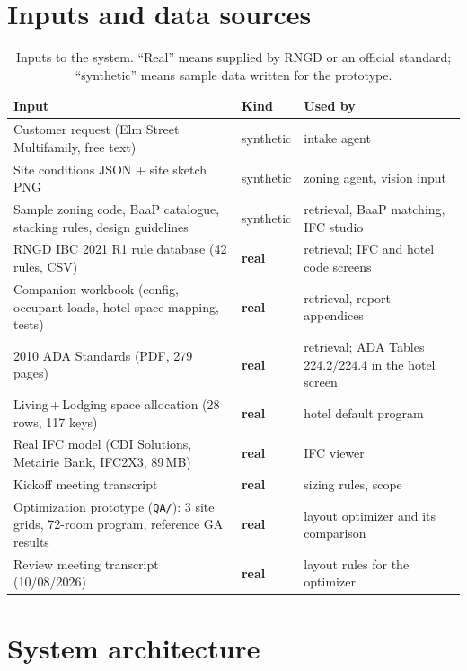 \documentclass[10pt,a4paper]{article}
\newcommand{\code}[1]{\texttt{\small #1}}
\theoremstyle{definition}
\begin{document}
\section{Inputs and data sources}
\label{sec:data}

\begin{table}[H]
\centering\small
\caption{Inputs to the system. ``Real'' means supplied by RNGD or an official standard; ``synthetic'' means sample data
written for the prototype.}
\label{tab:data}
\begin{tabularx}{\linewidth}{@{}l l X@{}}
\toprule
\textbf{Input} & \textbf{Kind} & \textbf{Used by} \\ \midrule
Customer request (Elm Street Multifamily, free text) & synthetic & intake agent \\
Site conditions JSON + site sketch PNG & synthetic & zoning agent, vision input \\
Sample zoning code, BaaP catalogue, stacking rules, design guidelines & synthetic & retrieval, BaaP matching, IFC studio \\
RNGD IBC 2021 R1 rule database (42 rules, CSV) & \textbf{real} & retrieval; IFC and hotel code screens \\
Companion workbook (config, occupant loads, hotel space mapping, tests) & \textbf{real} & retrieval, report appendices \\
2010 ADA Standards (PDF, 279 pages) & \textbf{real} & retrieval; ADA Tables 224.2/224.4 in the hotel screen \\
Living\,+\,Lodging space allocation (28 rows, 117 keys) & \textbf{real} & hotel default program \\
Real IFC model (CDI Solutions, Metairie Bank, IFC2X3, 89\,MB) & \textbf{real} & IFC viewer \\
Kickoff meeting transcript & \textbf{real} & sizing rules, scope \\
Optimization prototype (\code{QA/}): 3 site grids, 72-room program, reference GA results & \textbf{real} & layout optimizer and its comparison \\
Review meeting transcript (10/08/2026) & \textbf{real} & layout rules for the optimizer \\
\bottomrule
\end{tabularx}
\end{table}

\section{System architecture}
\label{sec:arch}
\end{document}
